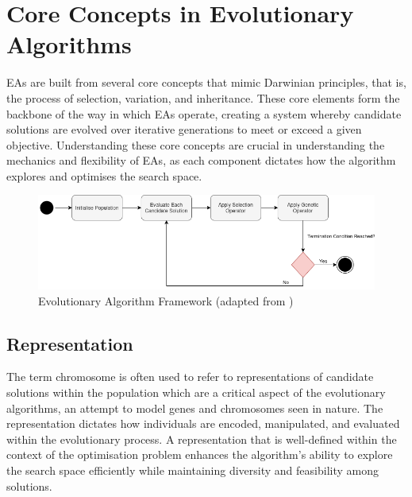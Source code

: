 \section{Core Concepts in Evolutionary Algorithms}\label{sec:ea_core_concepts}
EAs are built from several core concepts that mimic Darwinian principles, that is, the process of selection, variation, and inheritance. These core elements form the backbone of the way in which EAs operate, creating a system whereby candidate solutions are evolved over iterative generations to meet or exceed a given objective. Understanding these core concepts are crucial in understanding the mechanics and flexibility of EAs, as each component dictates how the algorithm explores and optimises the search space.

\begin{figure}[H] %
	\centering %
	\includegraphics[width=\textwidth]{Figures/chapter_ea/chapter_ea_ea_framework.png} %
	\caption{Evolutionary Algorithm Framework (adapted from \cite{handsOnGeneticAlgorithms})}
	\label{fig:ea_framework} %
\end{figure}

\subsection{Representation}
The term chromosome is often used to refer to representations of candidate solutions within the population which are a critical aspect of the evolutionary algorithms, an attempt to model genes and chromosomes seen in nature. The representation dictates how individuals are encoded, manipulated, and evaluated within the evolutionary process. A representation that is well-defined within the context of the optimisation problem enhances the algorithm's ability to explore the search space efficiently while maintaining diversity and feasibility among solutions. \bigskip

